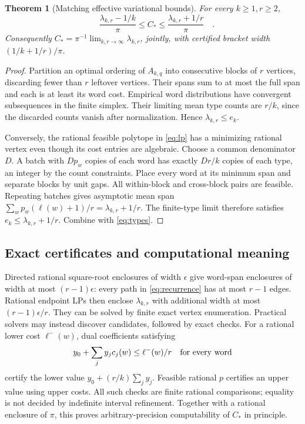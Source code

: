 \documentclass[11pt]{article}
\newtheorem{theorem}{Theorem}
\theoremstyle{definition}\newtheorem{definition}[theorem]{Definition}
\theoremstyle{remark}\newtheorem{remark}[theorem]{Remark}
\newcommand{\CC}{C_\ast}
\begin{document}
\begin{theorem}[Matching effective variational bounds]\label{thm:lp}
For every $k\ge1,r\ge2$,
\begin{equation}\label{eq:effective}
 \boxed{\quad\frac{\lambda_{k,r}-1/k}{\pi}\le\CC
 \le\frac{\lambda_{k,r}+1/r}{\pi}\quad}.
\end{equation}
Consequently $\CC=\pi^{-1}\lim_{k,r\to\infty}\lambda_{k,r}$, jointly,
with certified bracket width $(1/k+1/r)/\pi$.
\end{theorem}
\begin{proof}
Partition an optimal ordering of $A_{k,q}$ into consecutive blocks of
$r$ vertices, discarding fewer than $r$ leftover vertices. Their spans
sum to at most the full span and each is at least its word cost.
Empirical word distributions have convergent subsequences in the finite
simplex. Their limiting mean type counts are $r/k$, since the discarded
counts vanish after normalization. Hence $\lambda_{k,r}\le e_k$.

Conversely, the rational feasible polytope in \eqref{eq:lp} has a minimizing
rational vertex even though its cost entries are algebraic. Choose a
common denominator $D$. A batch with $Dp_w$ copies of each word has
exactly $Dr/k$ copies of each type, an integer by the count constraints.
Place every word at its minimum span and separate blocks by unit gaps.
All within-block and cross-block pairs are feasible. Repeating batches
gives asymptotic mean span
$\sum_w p_w(\ell(w)+1)/r=\lambda_{k,r}+1/r$.
The finite-type limit therefore satisfies
$e_k\le\lambda_{k,r}+1/r$. Combine with \eqref{eq:types}.
\end{proof}

\subsection{Exact certificates and computational meaning}
Directed rational square-root enclosures of width $\epsilon$ give
word-span enclosures of width at most $(r-1)\epsilon$: every path in
\eqref{eq:recurrence} has at most $r-1$ edges. Rational endpoint LPs
then enclose $\lambda_{k,r}$ with additional width at most
$(r-1)\epsilon/r$. They can be solved by finite exact vertex enumeration.
Practical solvers may instead discover candidates, followed by exact checks.
For a rational lower cost $\ell^-(w)$, dual coefficients satisfying
\[
 y_0+\sum_j y_jc_j(w)\le\ell^-(w)/r\quad\hbox{for every word}
\]
certify the lower value $y_0+(r/k)\sum_jy_j$. Feasible rational $p$
certifies an upper value using upper costs. All such checks are finite
rational comparisons; equality is not decided by indefinite interval
refinement. Together with a rational enclosure of $\pi$, this proves
arbitrary-precision computability of $\CC$ in principle.
\end{document}
